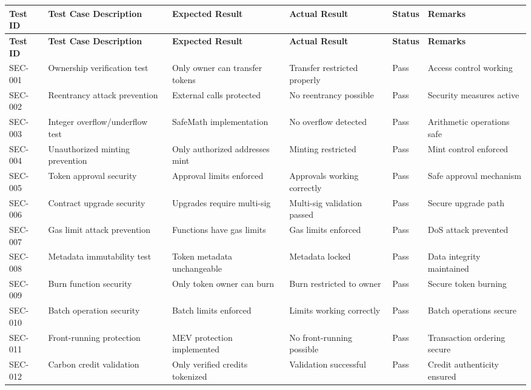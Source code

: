 \documentclass[oneside,a4paper,12pt]{book}
\begin{document}
\begin{longtable}{|p{1.2cm}|p{3cm}|p{2.3cm}|p{2.3cm}|p{1.5cm}|p{2cm}|}
\hline
\textbf{Test ID} & \textbf{Test Case Description} & \textbf{Expected Result} & \textbf{Actual Result} & \textbf{Status} & \textbf{Remarks} \\
\hline
\endfirsthead

\hline
\textbf{Test ID} & \textbf{Test Case Description} & \textbf{Expected Result} & \textbf{Actual Result} & \textbf{Status} & \textbf{Remarks} \\
\hline
\endhead

SEC-001 & Ownership verification test & Only owner can transfer tokens & Transfer restricted properly & Pass & Access control working \\
\hline
SEC-002 & Reentrancy attack prevention & External calls protected & No reentrancy possible & Pass & Security measures active \\
\hline
SEC-003 & Integer overflow/underflow test & SafeMath implementation & No overflow detected & Pass & Arithmetic operations safe \\
\hline
SEC-004 & Unauthorized minting prevention & Only authorized addresses mint & Minting restricted & Pass & Mint control enforced \\
\hline
SEC-005 & Token approval security & Approval limits enforced & Approvals working correctly & Pass & Safe approval mechanism \\
\hline
SEC-006 & Contract upgrade security & Upgrades require multi-sig & Multi-sig validation passed & Pass & Secure upgrade path \\
\hline
SEC-007 & Gas limit attack prevention & Functions have gas limits & Gas limits enforced & Pass & DoS attack prevented \\
\hline
SEC-008 & Metadata immutability test & Token metadata unchangeable & Metadata locked & Pass & Data integrity maintained \\
\hline
SEC-009 & Burn function security & Only token owner can burn & Burn restricted to owner & Pass & Secure token burning \\
\hline
SEC-010 & Batch operation security & Batch limits enforced & Limits working correctly & Pass & Batch operations secure \\
\hline
SEC-011 & Front-running protection & MEV protection implemented & No front-running possible & Pass & Transaction ordering secure \\
\hline
SEC-012 & Carbon credit validation & Only verified credits tokenized & Validation successful & Pass & Credit authenticity ensured \\

\end{longtable}
\end{document}
